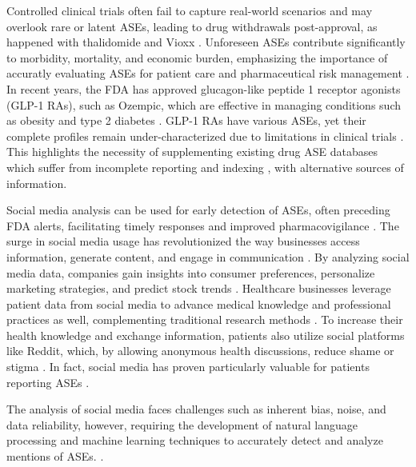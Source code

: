 \documentclass[referee,bst/sn-basic]{sn-jnl}%
\theoremstyle{thmstyletwo}%
\theoremstyle{thmstylethree}%
\begin{document}
Controlled clinical trials often fail to capture real-world scenarios and may overlook rare or latent ASEs, leading to drug withdrawals post-approval, as happened with thalidomide and Vioxx \cite{kim2012institutional,berlin2008adverse,ponrartana2021safety,ridings2013thalidomide}.
Unforeseen ASEs contribute significantly to morbidity, mortality, and economic burden, emphasizing the importance of accuratly evaluating ASEs for patient care and pharmaceutical risk management \cite{watanabe2018cost,gao2022does,martin2017much}.
In recent years, the FDA has approved glucagon-like peptide 1 receptor agonists (GLP-1 RAs), such as Ozempic, which are effective in managing conditions such as obesity and type 2 diabetes \cite{novo-nordisk-ozempic-2017,moore2023glp}. 
GLP-1 RAs have various ASEs, yet their complete profiles remain under-characterized due to limitations in clinical trials \cite{zhang2023glp}. 
This highlights the necessity of supplementing existing drug ASE databases which suffer from incomplete reporting and indexing \cite{derry2001incomplete,nugent2016computational,foster2008use}, with alternative sources of information. 

Social media analysis can be used for early detection of ASEs, often preceding FDA alerts, facilitating timely responses and improved pharmacovigilance \cite{lee2021use,loosier2021reddit,zhang2018utilizing,graves2022thematic,adjeroh2014signal}. 
The surge in social media usage has revolutionized the way businesses access information, generate content, and engage in communication \cite{hu2019generating,ren2023know}.
By analyzing social media data, companies gain insights into consumer preferences, personalize marketing strategies, and  predict stock trends \cite{hu2019generating,gunarathne2017whose}.
Healthcare businesses leverage patient data from social media to advance medical knowledge and professional practices as well, complementing traditional research methods \cite{golder2023role}.
To increase their health knowledge and exchange information, patients also utilize social platforms  \cite{xie2021unveiling} like Reddit, which, by allowing anonymous health discussions, reduce shame or stigma \cite{kamarudin2021study}.
In fact, social media has proven particularly valuable for patients reporting ASEs \cite{lee2021use,golder2023role}.

The analysis of social media faces challenges such as inherent bias, noise, and data reliability, however, requiring the development of natural language processing and machine learning techniques to accurately detect and analyze mentions of ASEs. \cite{convertino2018usefulness,pierce2017evaluation,feldman2015utilizing,patki2014mining,yang2015exploiting,wu2013exploiting,moh2017adverse,adjeroh2014signal,liu2013azdrugminer}.
\end{document}
